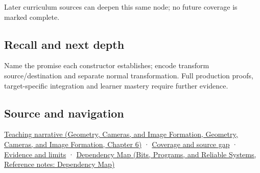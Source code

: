 Later curriculum sources can deepen this same node; no future coverage is marked complete.

\subsection{Recall and next depth}\label{appendix-380a220e2529-recall-and-next-depth}

Name the promise each constructor establishes; encode transform source/destination and separate normal transformation. Full production proofs, target-specific integration and learner mastery require further evidence.

\subsection{Source and navigation}\label{appendix-380a220e2529-source-and-navigation}

\href{../03-Geometry-Cameras-and-Image-Formation/main.pdf\#nameddest=02-foundations-ii-ch037-types-can-remember-the-promises-that-three-components-forget}{Teaching narrative (Geometry, Cameras, and Image Formation, Geometry, Cameras, and Image Formation, Chapter 6)} · \hyperref[appendix-fd090d982a15-phase-6---parts-501-600]{Coverage and source gap} · \hyperref[appendix-a103e7846d21-phase-6---source-analysis-and-verification]{Evidence and limits} · \href{../01-Bits-Programs-and-Reliable-Systems/main.pdf\#nameddest=appendix-4ad47bdd269a}{Dependency Map (Bits, Programs, and Reliable Systems, Reference notes: Dependency Map)}
